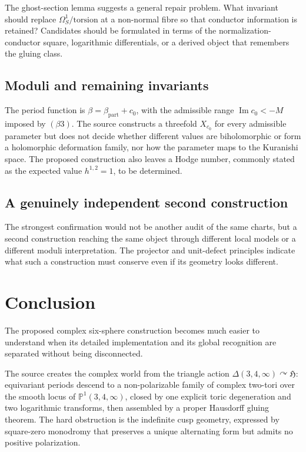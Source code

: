 \documentclass[11pt,reqno]{amsart}
\numberwithin{equation}{section}
\newcommand{\Pone}{\mathbb P^1}
\theoremstyle{definition}
\begin{document}
The ghost-section lemma suggests a general repair problem. What invariant should replace $\Omega_S^1/\mathrm{torsion}$ at a non-normal fibre so that conductor information is retained? Candidates should be formulated in terms of the normalization-conductor square, logarithmic differentials, or a derived object that remembers the gluing class.

\subsection{Moduli and remaining invariants}

The period function is $\beta=\beta_{\mathrm{part}}+c_0$, with the admissible range $\operatorname{Im}c_0<-M$ imposed by $(\beta3)$. The source constructs a threefold $X_{c_0}$ for every admissible parameter but does not decide whether different values are biholomorphic or form a holomorphic deformation family, nor how the parameter maps to the Kuranishi space. The proposed construction also leaves a Hodge number, commonly stated as the expected value $h^{1,2}=1$, to be determined.

\subsection{A genuinely independent second construction}

The strongest confirmation would not be another audit of the same charts, but a second construction reaching the same object through different local models or a different moduli interpretation. The projector and unit-defect principles indicate what such a construction must conserve even if its geometry looks different.

\section{Conclusion}\label{sec:conclusion}

The proposed complex six-sphere construction becomes much easier to understand when its detailed implementation and its global recognition are separated without being disconnected.

The source creates the complex world from the triangle action $\Delta(3,4,\infty)\curvearrowright\mathfrak H$: equivariant periods descend to a non-polarizable family of complex two-tori over the smooth locus of $\Pone(3,4,\infty)$, closed by one explicit toric degeneration and two logarithmic transforms, then assembled by a proper Hausdorff gluing theorem. The hard obstruction is the indefinite cusp geometry, expressed by square-zero monodromy that preserves a unique alternating form but admits no positive polarization.
\end{document}
